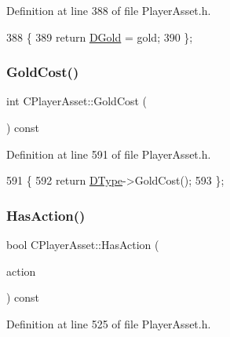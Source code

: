 Definition at line 388 of file Player\+Asset.\+h.


\begin{DoxyCode}
388                           \{
389             \textcolor{keywordflow}{return} \hyperlink{classCPlayerAsset_ab90ebdc73c6794fd44ddbe273f610292}{DGold} = gold;
390         \};
\end{DoxyCode}
\hypertarget{classCPlayerAsset_aa27a1ef30ef9f6a0452f7eeea6ae9516}{}\label{classCPlayerAsset_aa27a1ef30ef9f6a0452f7eeea6ae9516} 
\subsubsection{\texorpdfstring{Gold\+Cost()}{GoldCost()}}
{\footnotesize\ttfamily int C\+Player\+Asset\+::\+Gold\+Cost (\begin{DoxyParamCaption}{ }\end{DoxyParamCaption}) const\hspace{0.3cm}{\ttfamily [inline]}}



Definition at line 591 of file Player\+Asset.\+h.


\begin{DoxyCode}
591                             \{
592             \textcolor{keywordflow}{return} \hyperlink{classCPlayerAsset_a5d61f73471e1e6f0a6ab15f2ffa7b359}{DType}->GoldCost(); 
593         \};
\end{DoxyCode}
\hypertarget{classCPlayerAsset_acd64c8a11af0f9d17b232d3e1e85dda1}{}\label{classCPlayerAsset_acd64c8a11af0f9d17b232d3e1e85dda1} 
\subsubsection{\texorpdfstring{Has\+Action()}{HasAction()}}
{\footnotesize\ttfamily bool C\+Player\+Asset\+::\+Has\+Action (\begin{DoxyParamCaption}\item[{\hyperlink{GameDataTypes_8h_ab47668e651a3032cfb9c40ea2d60d670}{E\+Asset\+Action}}]{action }\end{DoxyParamCaption}) const\hspace{0.3cm}{\ttfamily [inline]}}



Definition at line 525 of file Player\+Asset.\+h.


